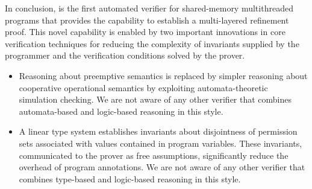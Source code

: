 In conclusion, \civl is the first automated verifier for shared-memory multithreaded programs that 
provides the capability to establish a multi-layered refinement proof.
This novel capability is enabled by two important innovations in core verification techniques
for reducing the complexity of invariants supplied by the programmer and the verification conditions solved by the prover.
\begin{itemize}
\item
Reasoning about preemptive semantics is replaced by simpler reasoning about cooperative operational semantics by exploiting 
automata-theoretic simulation checking.
We are not aware of any other verifier that combines automata-based and logic-based reasoning in this style.
\item 
A linear type system establishes invariants about disjointness of permission sets associated with values contained in program variables.
These invariants, communicated to the prover as free assumptions, significantly reduce the overhead of program annotations.
We are not aware of any other verifier that combines type-based and logic-based reasoning in this style.
\end{itemize}
